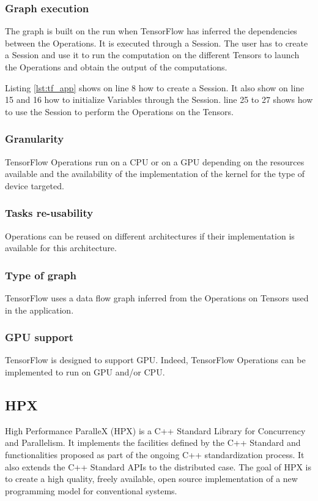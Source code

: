 \subsubsection{Graph execution}
The graph is built on the run when TensorFlow has inferred the dependencies between the Operations.
It is executed through a Session.
The user has to create a Session and use it to run the computation on the different Tensors to launch the Operations and obtain the output of the computations.

Listing \ref{lst:tf_app} shows on line 8 how to create a Session.
It also show on line 15 and 16 how to initialize Variables through the Session.
line 25 to 27 shows how to use the Session to perform the Operations on the Tensors.


\subsubsection{Granularity}
TensorFlow Operations run on a CPU or on a GPU depending on the resources available and the availability of the implementation of the kernel for the type of device targeted.

\subsubsection{Tasks re-usability}
Operations can be reused on different architectures if their implementation is available for this architecture.

\subsubsection{Type of graph}
TensorFlow uses a data flow graph inferred from the Operations on Tensors used in the application.

\subsubsection{GPU support}
TensorFlow is designed to support GPU.
Indeed, TensorFlow Operations can be implemented to run on GPU and/or CPU.





\subsection{HPX}
High Performance ParalleX (HPX) \cite{KHASF2014} \cite{KAHBS2019} is a C++ Standard Library for Concurrency and Parallelism.
It implements the facilities defined by the C++ Standard and functionalities proposed as part of the ongoing C++ standardization process.
It also extends the C++ Standard APIs to the distributed case.
The goal of HPX is to create a high quality, freely available, open source implementation of a new programming model for conventional systems.

